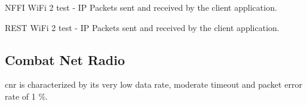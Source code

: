 \begin{landscape}
    \begin{figure}
    \centering
    \begin{floatrow}
    \end{floatrow}
    \end{figure}
\end{landscape}

\begin{table}[h]

\caption{NFFI WiFi 2 test - IP Packets sent and received by the client application.}
\label{table:wifi2-test-packets-nffi}
\end{table}

\begin{table}[h]

\caption{REST WiFi 2 test - IP Packets sent and received by the client application.}
\label{table:wifi2-test-packets-rest}
\end{table}

\subsection{Combat Net Radio}

\gls{cnr} is characterized by its very low data rate, moderate timeout and packet
error rate of 1 \%.


